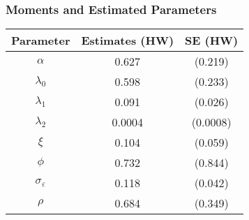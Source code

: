 \documentclass[usenames,dvipsnames, handout]{beamer}
\begin{document}
\begin{frame}
\frametitle{Moments and Estimated Parameters}
\scriptsize
\begin{center}
\begin{tabular}{ ccc } 
 \hline
 Parameter            & Estimates (HW) & SE (HW) \\ 
 \hline
 $\alpha$             & 0.627 &(0.219) \\ 
 $\lambda_0$          & 0.598 &(0.233) \\ 
 $\lambda_1$          & 0.091 &(0.026) \\ 
 $\lambda_2$          & 0.0004 &(0.0008) \\ 
 $\xi$                & 0.104 &(0.059) \\
 $\phi$               & 0.732 &(0.844) \\
 $\sigma_\varepsilon$ & 0.118 &(0.042) \\
 $\rho$               & 0.684 &(0.349) \\
 \hline 
\end{tabular}
\end{center}

\begin{center}
\end{center}
\end{frame}
\end{document}
